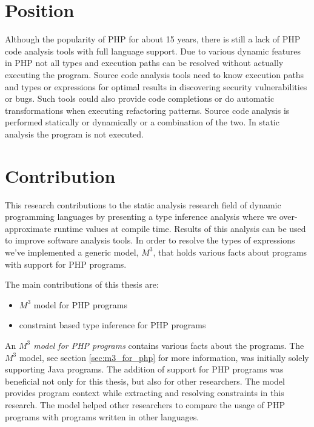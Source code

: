 \documentclass[../main.tex]{subfiles}
\begin{document}
    \section{Position} 
    	Although the popularity of PHP for about 15 years, there is still a lack of PHP code analysis tools with full language support.
        Due to various dynamic features in PHP not all types and execution paths can be resolved without actually executing the program.
        Source code analysis tools need to know execution paths and types or expressions for optimal results in discovering security vulnerabilities or bugs.
        Such tools could also provide code completions or do automatic transformations when executing refactoring patterns.
        Source code analysis is performed statically or dynamically or a combination of the two.
        In static analysis the program is not executed.


    \section{Contribution}        
        This research contributions to the static analysis research field of dynamic programming languages by presenting a type inference analysis where we over-approximate runtime values at compile time.
        Results of this analysis can be used to improve software analysis tools.
        In order to resolve the types of expressions we've implemented a generic model, $M^3$, that holds various facts about programs with support for PHP programs.
        
        The main contributions of this thesis are:
        \begin{itemize}
            \item $M^3$ model for PHP programs
            \item constraint based type inference for PHP programs
        \end{itemize}

		An \textit{$M^3$ model for PHP programs} contains various facts about the programs.
		The $M^3$ model, see section \ref{sec:m3_for_php} for more information, was initially solely supporting Java programs.
		The addition of support for PHP programs was beneficial not only for this thesis, but also for other researchers.
		The model provides program context while extracting and resolving constraints in this research.
		The model helped other researchers to compare the usage of PHP programs with programs written in other languages.
\end{document}
